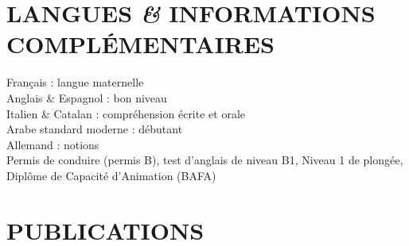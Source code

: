 \documentclass{article}
\begin{document}
\section*{LANGUES \textit{\&} INFORMATIONS COMPLÉMENTAIRES}

Français : langue maternelle \\
Anglais \& Espagnol : bon niveau \\
Italien \& Catalan : compréhension écrite et orale \\
Arabe standard moderne : débutant \\
Allemand : notions \\

Permis de conduire (permis B), test d'anglais de niveau B1, Niveau 1 de plongée, Diplôme de Capacité d'Animation (BAFA)


\section{PUBLICATIONS}
\end{document}
